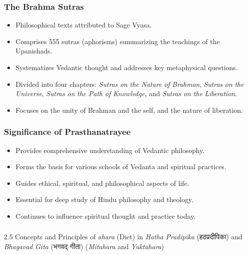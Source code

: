 \begin{frame}[fragile]\frametitle{The Brahma Sutras}

      \begin{itemize}
		\item Philosophical texts attributed to Sage Vyasa.
		\item Comprises 555 sutras (aphorisms) summarizing the teachings of the Upanishads.
		\item Systematizes Vedantic thought and addresses key metaphysical questions.
		\item Divided into four chapters: \textit{Sutras on the Nature of Brahman}, \textit{Sutras on the Universe}, \textit{Sutras on the Path of Knowledge}, and \textit{Sutras on the Liberation}.
		\item Focuses on the unity of Brahman and the self, and the nature of liberation.
	  \end{itemize}

\end{frame}

\begin{frame}[fragile]\frametitle{Significance of Prasthanatrayee}

      \begin{itemize}
		\item Provides comprehensive understanding of Vedantic philosophy.
		\item Forms the basis for various schools of Vedanta and spiritual practices.
		\item Guides ethical, spiritual, and philosophical aspects of life.
		\item Essential for deep study of Hindu philosophy and theology.
		\item Continues to influence spiritual thought and practice today.
	  \end{itemize}

\end{frame}


\begin{frame}[fragile]\frametitle{}
\begin{center}
{\Large 2.5 Concepts and Principles of \textit{ahara} (Diet) in \textit{Hatha Pradipika} (हठप्रदीपिका) and \textit{Bhagavad Gita} (भगवद् गीता) (\textit{Mitahara} and \textit{Yuktahara})}
\end{center}
\end{frame}

